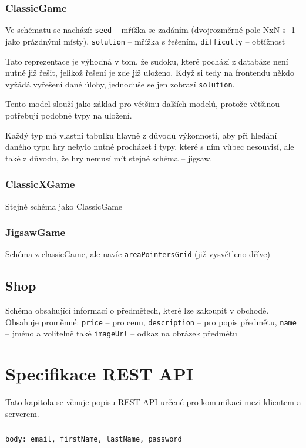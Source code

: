 \documentclass[a4paper,oneside,12pt]{report}
\begin{document}
\subsubsection{ClassicGame}
Ve schématu se nachází: \texttt{seed} -- mřížka se zadáním (dvojrozměrné pole NxN s -1 jako prázdnými místy), \texttt{solution} -- mřížka s řešením, \texttt{difficulty} -- obtížnost

Tato reprezentace je výhodná v tom, že sudoku, které pochází z databáze není nutné již řešit, jelikož řešení je zde již uloženo. Když si tedy na frontendu někdo vyžádá vyřešení dané úlohy, jednoduše se jen zobrazí \texttt{solution}. 

Tento model slouží jako základ pro většinu dalších modelů, protože většinou potřebují podobné typy na uložení.

Každý typ má vlastní tabulku hlavně z důvodů výkonnosti, aby při hledání daného typu hry nebylo nutné procházet i typy, které s ním vůbec nesouvisí, ale také z důvodu, že hry nemusí mít stejné schéma -- jigsaw.

\subsubsection{ClassicXGame}
Stejné schéma jako ClassicGame

\subsubsection{JigsawGame}
Schéma z classicGame, ale navíc \texttt{areaPointersGrid} (již vysvětleno dříve)

\subsection{Shop}
Schéma obsahující informací o předmětech, které lze zakoupit v obchodě. Obsahuje proměnné: \texttt{price} -- pro cenu, \texttt{description} -- pro popis předmětu, \texttt{name} -- jméno a volitelně také \texttt{imageUrl} -- odkaz na obrázek předmětu

\section{Specifikace REST API}
Tato kapitola se věnuje popisu REST API určené pro komunikaci mezi klientem a serverem.

\subsubsection{\color{apiblue}{POST -- /api/auth/register}}
\texttt{body: email, firstName, lastName, password} 
\end{document}
